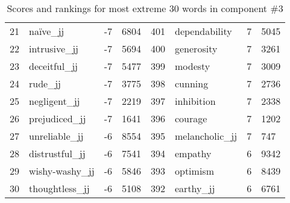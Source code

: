 \begin{table}[tbp]
\begin{tabular}{| rlr@{.}l | rlr@{.}l |}
    21 & naïve\_jj & -7 & 6804    &    401 & dependability & 7 & 5045 \\
    22 & intrusive\_jj & -7 & 5694    &    400 & generosity & 7 & 3261 \\
    23 & deceitful\_jj & -7 & 5477    &    399 & modesty & 7 & 3009 \\
    24 & rude\_jj & -7 & 3775    &    398 & cunning & 7 & 2736 \\
    25 & negligent\_jj & -7 & 2219    &    397 & inhibition & 7 & 2338 \\
    26 & prejudiced\_jj & -7 & 1641    &    396 & courage & 7 & 1202 \\
    27 & unreliable\_jj & -6 & 8554    &    395 & melancholic\_jj & 7 & 747 \\
    28 & distrustful\_jj & -6 & 7541    &    394 & empathy & 6 & 9342 \\
    29 & wishy-washy\_jj & -6 & 5846    &    393 & optimism & 6 & 8439 \\
    30 & thoughtless\_jj & -6 & 5108    &    392 & earthy\_jj & 6 & 6761 \\
    \hline
    \end{tabular}
    \caption{Scores and rankings for most extreme 30 words in component \#3} 
\end{table}
\clearpage
